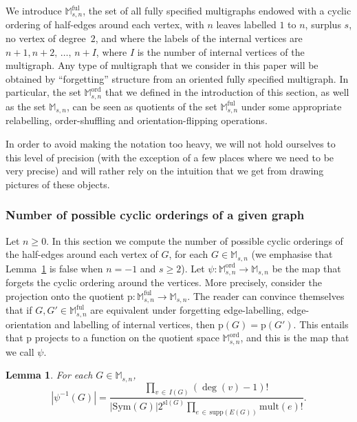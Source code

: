 \documentclass[10pt]{amsart}
\newtheorem{lemm}[theo]{Lemma}\newtheorem{prop}[theo]{Proposition}\newtheorem{coro}[theo]{Corollary}\newtheorem{conj}[theo]{Conjecture}
\theoremstyle{definition}\newtheorem{defi}[theo]{Definition}\newtheorem{rema}[theo]{Remark}\newtheorem{exam}[theo]{Example}\newtheorem{exem}[theo]{Example}\newtheorem{nota}[theo]{Notation}
\newcommand{\abs}[1]{\left\lvert#1\right\rvert}
\newcommand{\supp}{\mathrm{supp}}
\newcommand{\ord}{\mathrm{ord}}
\newcommand{\sll}{\mathrm{sl}}
\newcommand{\rmp}{\mathrm{p}}
\newcommand{\Sym}{\mathrm{Sym}}
\newcommand{\mult}{\mathrm{mult}}
\newcommand{\ful}{\mathrm{ful}}
\newcommand{\M}{\mathbb{M}}
\begin{document}
We introduce $\M_{s,n}^{\ful}$, the set of all fully specified multigraphs endowed with a cyclic ordering of half-edges around each vertex, with $n$ leaves labelled $1$ to $n$, surplus $s$, no vertex of degree~$2$, and where the labels of the internal vertices are $n+1, n+2,\,\dots,\,n+I$, where $I$ is the number of internal vertices of the multigraph. Any type of multigraph that we consider in this paper will be obtained by ``forgetting'' structure from an oriented fully specified multigraph. In particular, the set $\M^{\ord}_{s,n}$ that we defined in the introduction of this section, as well as the set $\M_{s,n}$, can be seen as quotients of the set $\M_{s,n}^{\ful}$ under some appropriate relabelling, order-shuffling and orientation-flipping operations.


In order to avoid making the notation too heavy, we will not hold ourselves to this level of precision (with the exception of a few places where we need to be very precise) and will rather rely on the intuition that we get from drawing pictures of these objects.


\subsubsection{Number of possible cyclic orderings of a given graph}
Let $n\geq 0$. In this section we compute the number of possible cyclic orderings of the half-edges around each vertex of $G$, for each $G\in \M_{s,n}$ (we emphasise that Lemma~\ref{lem:co} is false when $n=-1$ and $s\geq 2$). Let $\psi:\M_{s,n}^{\ord}\rightarrow \M_{s,n}$ be the map that forgets the cyclic ordering around the vertices. More precisely, consider the projection onto the quotient $\rmp:\M_{s,n}^{\ful}\rightarrow \M_{s,n}$. The reader can convince themselves that if $G,G'\in \M_{s,n}^{\ful}$ are equivalent under forgetting edge-labelling, edge-orientation and labelling of internal vertices, then $\rmp(G)=\rmp(G')$. This entails that $\rmp$ projects to a function on the quotient space $\M_{s,n}^{\ord}$, and this is the map that we call $\psi$.

\begin{lemm}\label{lem:co}
For each $G \in \M_{s,n}$,
\begin{equation*}\label{eq:nb of cyclic orderings}
\left|\psi^{-1}(G) \right|=\frac{\prod\limits_{v\,\in\,I(G)}(\deg(v) -1)!}{\abs{\Sym(G)} 2^{\sll(G)} \prod\limits_{e\,\in\,\supp(E(G))}\mult(e)!}.
\end{equation*}
\end{lemm}
\end{document}
